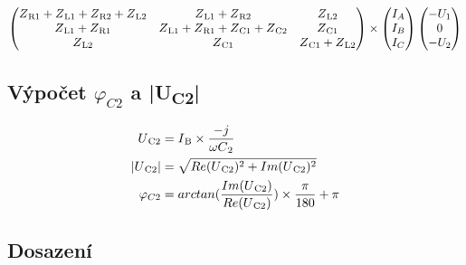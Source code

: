 \begin{align*}
\begin{pmatrix}
    Z\textsubscript{R1} + Z\textsubscript{L1} + Z\textsubscript{R2} + Z\textsubscript{L2}&Z\textsubscript{L1} + Z\textsubscript{R2}&Z\textsubscript{L2}\\
    Z\textsubscript{L1} + Z\textsubscript{R1}&Z\textsubscript{L1} + Z\textsubscript{R1} + Z\textsubscript{C1} + Z\textsubscript{C2}&Z\textsubscript{C1}\\
    Z\textsubscript{L2}&Z\textsubscript{C1}&Z\textsubscript{C1} + Z\textsubscript{L2}
\end{pmatrix}
\times
\begin{pmatrix}
	I_A\\ I_B\\ I_C
\end{pmatrix}
\begin{pmatrix}
    -U_1\\ 0\\ -U_2
\end{pmatrix}
\end{align*}

\subsection{Výpočet $\varphi_{C2}$ a |U\textsubscript{C2}|}

\begin{align*}
	U\textsubscript{C2} &= I\textsubscript{B} \times \frac{-j}{\omega C\textsubscript{2}} \\
	|U\textsubscript{C2}| &= \sqrt{Re(U\textsubscript{C2})^2 + Im(U\textsubscript{C2})^2} \\
	\varphi_{C2}&= arctan(\frac{Im(U\textsubscript{C2})}{Re(U\textsubscript{C2})}) \times \frac{\pi}{180} + \pi
\end{align*}

\subsection{Dosazení}